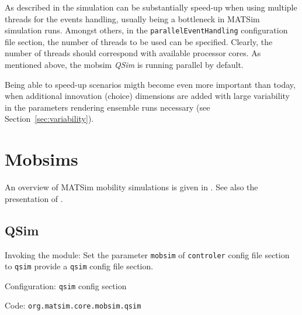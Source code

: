 As described in \citet[][]{WaraichEtAl_TechRep_IVT_2009, WaraichEtAl_STRC_2009} the simulation can be substantially speed-up when using multiple threads for the events handling, usually being a bottleneck in MATSim simulation runs. Amongst others, in the \lstinline|parallelEventHandling| configuration file section, the number of threads to be used can be specified. Clearly, the number of threads should correspond with available processor cores.    As mentioned above, the mobsim \emph{QSim} is running parallel by default.

Being able to speed-up scenarios migth become even more important than today, when additional innovation (choice) dimensions are added with large variability in the parameters rendering ensemble runs necessary (see Section~\ref{sec:variability}).







\section{Mobsims}
\label{sec:mobsims}
An overview of MATSim mobility simulations is given in \citet[][]{Dobler_TechRep_IVT_2011}. See also the presentation of \citet[][]{Rieser_unpub_IVT_2011}.

\subsection{QSim}
\label{sec:qsim}
\begin{compactitem}
\item Invoking the module: Set the parameter \lstinline|mobsim| of \lstinline|controler| config file section to \lstinline|qsim| provide a \lstinline|qsim| config file section.
\item Configuration: \lstinline|qsim| config section
\item Code: \lstinline|org.matsim.core.mobsim.qsim|
\end{compactitem}

